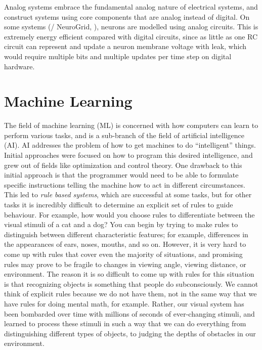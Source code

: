Analog systems embrace the fundamental analog nature of electrical systems,
and construct systems using core components that are analog instead of digital.
On some systems (\eg/ NeuroGrid, \textcite{Benjamin2014}),
neurons are modelled using analog circuits.
This is extremely energy efficient compared with digital circuits,
since as little as one RC circuit can represent
and update a neuron membrane voltage with leak,
which would require multiple bits and multiple updates per time step
on digital hardware.


\chapter{Machine Learning}

The field of machine learning (ML) is concerned with how computers
can learn to perform various tasks,
and is a sub-branch of the field of artificial intelligence (AI).
AI addresses the problem of how to get machines
to do ``intelligent'' things.
Initial approaches were focused on how to program this desired intelligence,
and grew out of fields like optimization and control theory.
One drawback to this initial approach is that the programmer would need
to be able to formulate specific instructions telling the machine how to
act in different circumstances.
This led to \emph{rule based systems},
which are successful at some tasks,
but for other tasks it is incredibly difficult to determine
an explicit set of rules to guide behaviour.
For example, how would you choose rules to differentiate between
the visual stimuli of a cat and a dog?
You can begin by trying to make rules to distinguish between different
characteristic features;
for example, differences in the appearances of ears, noses, mouths, and so on.
However, it is very hard to come up with rules that cover
even the majority of situations,
and promising rules may prove to be fragile to changes in viewing angle,
viewing distance, or environment.
The reason it is so difficult to come up with rules for this situation
is that recognizing objects is something that people do subconsciously.
We cannot think of explicit rules because we do not have them,
not in the same way that we have rules for doing mental math, for example.
Rather, our visual system has been bombarded over time with
millions of seconds of ever-changing stimuli,
and learned to process these stimuli in such a way that we can do everything
from distinguishing different types of objects,
to judging the depths of obstacles in our environment.

